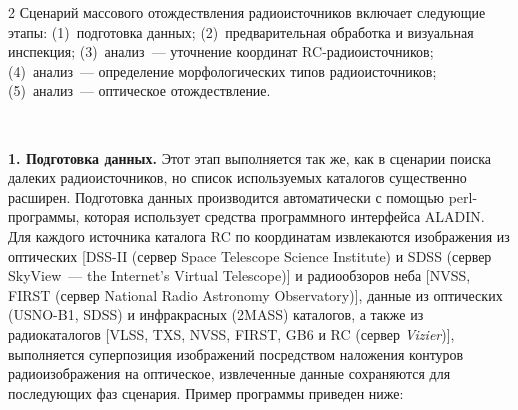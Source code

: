 \begin{multicols}{2}
      Сценарий массового отождествления радиоисточников включает следующие этапы: 
(1)~подготовка данных; (2)~предварительная обработка и визуальная инспекция; 
(3)~анализ~--- уточнение координат RC-ра\-дио\-ис\-точ\-ни\-ков; (4)~анализ~--- 
определение морфологических типов радиоисточников; (5)~анализ~--- оптическое 
отождествление. 

\begin{figure}[b] %
\vspace*{1pt}
 \begin{center}
 \mbox{%
 \epsfxsize=162.053mm
 }
 \end{center}
 \vspace*{-9pt}
\end{figure}
      
\textbf{1. Подготовка данных.} Этот этап выполняется так же, как в сценарии поиска 
далеких радиоисточников, но список используемых каталогов существенно расширен. 
Подготовка данных производится автоматически с помощью {perl}-программы, 
которая использует средства программного интерфейса ALADIN. Для каждого источника 
каталога RC по координатам извлекаются изображения из оптических [DSS-II (сервер 
{Space Telescope Science Institute}) и SDSS (сервер {SkyView~--- the Internet's 
Virtual Telescope})] и радиообзоров неба [NVSS, FIRST (сервер {National Radio 
Astronomy Observatory})], данные из оптических (USNO-B1, SDSS) и 
инфракрасных (2MASS) каталогов, а также из радиокаталогов [VLSS, TXS, NVSS, 
FIRST, GB6 и RC (сервер \textit{Vizier})], выполняется суперпозиция изображений 
посредством наложения контуров радиоизображения на оптическое, извлеченные данные 
сохраняются для последующих фаз сценария. Пример программы приведен ниже:



\end{multicols}
